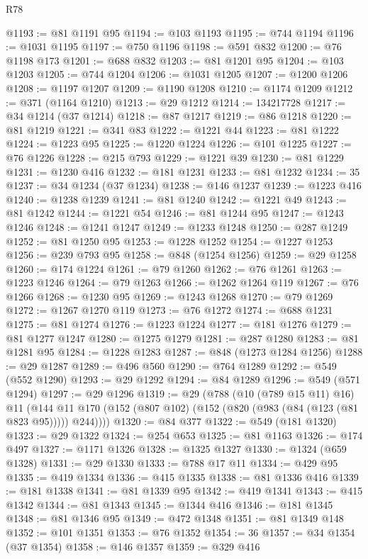 \begin{lexlean}{R78}
\begin{coremodule}
@1193 := @81 @1191 @95
@1194 := @103 @1193
@1195 := @744 @1194
@1196 := @1031 @1195
@1197 := @750 @1196
@1198 := @591 @832
@1200 := @76 @1198 @173
@1201 := @688 @832
@1203 := @81 @1201 @95
@1204 := @103 @1203
@1205 := @744 @1204
@1206 := @1031 @1205
@1207 := @1200 @1206
@1208 := @1197 @1207
@1209 := @1190 @1208
@1210 := @1174 @1209
@1212 := @371 (@1164 @1210)
@1213 := @29 @1212
@1214 := 134217728
@1217 := @34 @1214 (@37 @1214)
@1218 := @87 @1217
@1219 := @86 @1218
@1220 := @81 @1219
@1221 := @341 @83
@1222 := @1221 @44
@1223 := @81 @1222
@1224 := @1223 @95
@1225 := @1220 @1224
@1226 := @101 @1225
@1227 := @76 @1226
@1228 := @215 @793
@1229 := @1221 @39
@1230 := @81 @1229
@1231 := @1230 @416
@1232 := @181 @1231
@1233 := @81 @1232
@1234 := 35
@1237 := @34 @1234 (@37 @1234)
@1238 := @146 @1237
@1239 := @1223 @416
@1240 := @1238 @1239
@1241 := @81 @1240
@1242 := @1221 @49
@1243 := @81 @1242
@1244 := @1221 @54
@1246 := @81 @1244 @95
@1247 := @1243 @1246
@1248 := @1241 @1247
@1249 := @1233 @1248
@1250 := @287 @1249
@1252 := @81 @1250 @95
@1253 := @1228 @1252
@1254 := @1227 @1253
@1256 := @239 @793 @95
@1258 := @848 (@1254 @1256)
@1259 := @29 @1258
@1260 := @174 @1224
@1261 := @79 @1260
@1262 := @76 @1261
@1263 := @1223 @1246
@1264 := @79 @1263
@1266 := @1262 @1264 @119
@1267 := @76 @1266
@1268 := @1230 @95
@1269 := @1243 @1268
@1270 := @79 @1269
@1272 := @1267 @1270 @119
@1273 := @76 @1272
@1274 := @688 @1231
@1275 := @81 @1274
@1276 := @1223 @1224
@1277 := @181 @1276
@1279 := @81 @1277 @1247
@1280 := @1275 @1279
@1281 := @287 @1280
@1283 := @81 @1281 @95
@1284 := @1228 @1283
@1287 := @848 (@1273 @1284 @1256)
@1288 := @29 @1287
@1289 := @496 @560
@1290 := @764 @1289
@1292 := @549 (@552 @1290)
@1293 := @29 @1292
@1294 := @84 @1289
@1296 := @549 (@571 @1294)
@1297 := @29 @1296
@1319 := @29
    (@788
      (@10 (@789 @15 @11) @16)
      @11
      (@144 @11 @170 (@152 (@807 @102) (@152 (@820 (@983 (@84 (@123 (@81 @823 @95))))) @244))))
@1320 := @84 @377
@1322 := @549 (@181 @1320)
@1323 := @29 @1322
@1324 := @254 @653
@1325 := @81 @1163
@1326 := @174 @497
@1327 := @1171 @1326
@1328 := @1325 @1327
@1330 := @1324 (@659 @1328)
@1331 := @29 @1330
@1333 := @788 @17 @11
@1334 := @429 @95
@1335 := @419 @1334
@1336 := @415 @1335
@1338 := @81 @1336 @416
@1339 := @181 @1338
@1341 := @81 @1339 @95
@1342 := @419 @1341
@1343 := @415 @1342
@1344 := @81 @1343
@1345 := @1344 @416
@1346 := @181 @1345
@1348 := @81 @1346 @95
@1349 := @472 @1348
@1351 := @81 @1349 @148
@1352 := @101 @1351
@1353 := @76 @1352
@1354 := 36
@1357 := @34 @1354 (@37 @1354)
@1358 := @146 @1357
@1359 := @329 @416

\end{coremodule}
\end{lexlean}
